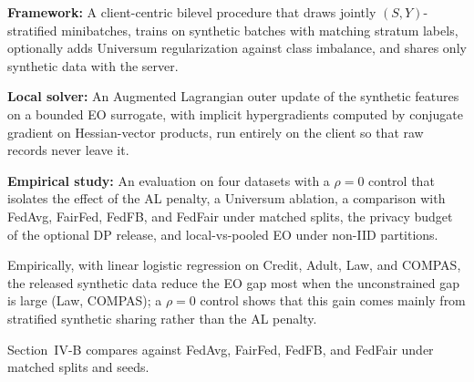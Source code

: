 \item \textbf{Framework:} A client-centric bilevel procedure that draws jointly $(S,Y)$-stratified minibatches, trains on synthetic batches with matching stratum labels, optionally adds Universum regularization against class imbalance, and shares only synthetic data with the server.
\item \textbf{Local solver:} An Augmented Lagrangian outer update of the synthetic features on a bounded EO surrogate, with implicit hypergradients computed by conjugate gradient on Hessian-vector products, run entirely on the client so that raw records never leave it.
\item \textbf{Empirical study:} An evaluation on four datasets with a $\rho{=}0$ control that isolates the effect of the AL penalty, a Universum ablation, a comparison with FedAvg, FairFed, FedFB, and FedFair under matched splits, the privacy budget of the optional DP release, and local-vs-pooled EO under non-IID partitions.

Empirically, with linear logistic regression on Credit, Adult, Law, and COMPAS, the released synthetic data reduce the EO gap most when the unconstrained gap is large (Law, COMPAS); a $\rho{=}0$ control shows that this gain comes mainly from stratified synthetic sharing rather than the AL penalty.

Section~IV-B compares against FedAvg, FairFed, FedFB, and FedFair under matched splits and seeds.

